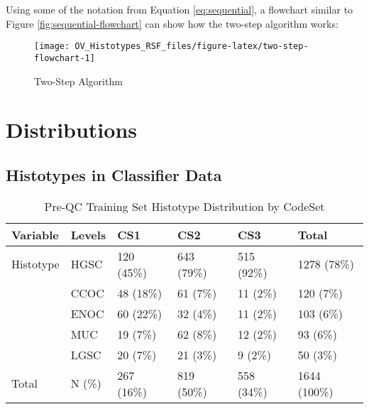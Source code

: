 \documentclass[
]{report}
\begin{document}
Using some of the notation from Equation \eqref{eq:sequential}, a flowchart similar to Figure \ref{fig:sequential-flowchart} can show how the two-step algorithm works:

\begin{figure}[H]

{\centering \texttt{[image: OV\_Histotypes\_RSF\_files/figure-latex/two-step-flowchart-1]} 

}

\caption{Two-Step Algorithm}\label{fig:two-step-flowchart}
\end{figure}

\hypertarget{distributions}{%
\chapter{Distributions}\label{distributions}}

\hypertarget{histotypes-in-classifier-data}{%
\section{Histotypes in Classifier Data}\label{histotypes-in-classifier-data}}

\begin{table}

\caption{\label{tab:preqc-hist-codeset}Pre-QC Training Set Histotype Distribution by CodeSet}
\centering
\begin{tabular}[t]{l|l|l|l|l|l}
\hline
Variable & Levels & CS1 & CS2 & CS3 & Total\\
\hline
Histotype & HGSC & 120 (45\%) & 643 (79\%) & 515 (92\%) & 1278 (78\%)\\
\hline
 & CCOC & 48 (18\%) & 61 (7\%) & 11 (2\%) & 120 (7\%)\\
\hline
 & ENOC & 60 (22\%) & 32 (4\%) & 11 (2\%) & 103 (6\%)\\
\hline
 & MUC & 19 (7\%) & 62 (8\%) & 12 (2\%) & 93 (6\%)\\
\hline
 & LGSC & 20 (7\%) & 21 (3\%) & 9 (2\%) & 50 (3\%)\\
\hline
Total & N (\%) & 267 (16\%) & 819 (50\%) & 558 (34\%) & 1644 (100\%)\\
\hline
\end{tabular}
\end{table}
\end{document}

